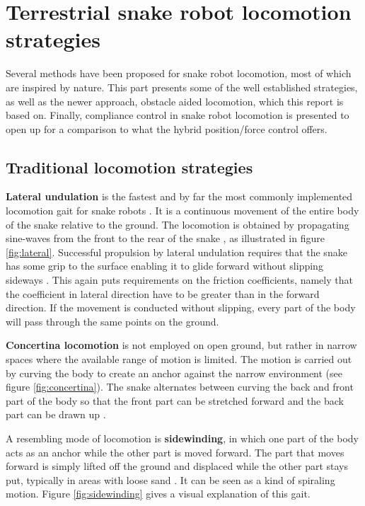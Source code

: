 \section{Terrestrial snake robot locomotion strategies}\label{sec:locomotion}



Several methods have been proposed for snake robot locomotion, most of which are inspired by nature. This part presents some of the well established strategies, as well as the newer approach, obstacle aided locomotion, which this report is based on. Finally, compliance control in snake robot locomotion is presented to open up for a comparison to what the hybrid position/force control offers.

\subsection{Traditional locomotion strategies}\label{subsec:traditional-loco}

\textbf{Lateral undulation} is the fastest and by far the most commonly implemented locomotion gait for snake robots \cite{sanfilippo2017perception}.
It is a continuous movement of the entire body of the snake relative to the ground. The locomotion is obtained by propagating sine-waves from the front to the rear of the snake \cite{transeth2006developments}, as illustrated in figure \ref{fig:lateral}.
Successful propulsion by lateral undulation requires that the snake has some grip to the surface enabling it to glide forward without slipping sideways \cite{liljeback2012review}. This again puts requirements on the friction coefficients, namely that the coefficient in lateral direction have to be greater than in the forward
direction. If the movement is conducted without slipping, every part of the body will pass through the same points on the ground.

\textbf{Concertina locomotion} is not employed on open ground, but rather in narrow spaces where the available range of motion is limited. The motion is carried out by curving the body
to create an anchor against the narrow environment (see figure \ref{fig:concertina}). The snake alternates between curving the back and front part of the body so that the front part can be stretched forward and the back part can be drawn up \cite{liljeback2012snake}.

A resembling mode of locomotion is \textbf{sidewinding}, in which one part of the body acts as an anchor while the other part is moved forward. The part that moves forward is simply lifted off the ground and displaced while the other part stays put, typically in areas with loose sand \cite{liljeback2012snake}. It can be seen as a kind of spiraling motion. Figure \ref{fig:sidewinding} gives a visual explanation of this gait.


